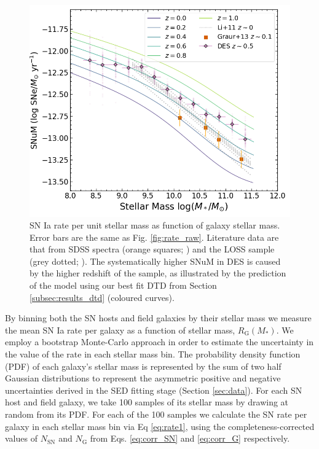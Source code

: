 \documentclass[fleqn,usenatbib]{mnras}
\begin{document}
\begin{figure}
    \centering
    \includegraphics[width=.5\textwidth]{figs/SNuM.png}
    \caption{SN Ia rate per unit stellar mass as function of galaxy stellar mass. Error bars are the same as Fig. \ref{fig:rate_raw}. Literature data are that from SDSS spectra (orange squares; \citealt{Graur2013}) and the LOSS sample (grey dotted; \citealt{Li2011a}). The systematically higher SNuM in DES is caused by the higher redshift of the sample, as illustrated by the  prediction of the model using our best fit DTD from Section \ref{subsec:results_dtd} (coloured curves). }%
    \label{fig:snum}
\end{figure}
By binning both the SN hosts and field galaxies by their stellar mass we measure the mean SN Ia rate per galaxy as a function of stellar mass, $R_{\mathrm{G}}(M_*)$. We employ a bootstrap Monte-Carlo approach in order to estimate the uncertainty in the value of the rate in each stellar mass bin. The probability density function (PDF) of each galaxy's stellar mass is represented by the sum of two half Gaussian distributions to represent the asymmetric positive and negative uncertainties derived in the SED fitting stage (Section \ref{sec:data}). For each SN host and field galaxy, we take 100 samples of its stellar mass by drawing at random from its PDF. For each of the 100 samples we calculate the SN rate per galaxy in each stellar mass bin via Eq \ref{eq:rate1}, using the completeness-corrected values of $N_{\mathrm{SN}}$ and $N_{\mathrm{G}}$ from Eqs. \ref{eq:corr_SN} and \ref{eq:corr_G} respectively. 
\end{document}
